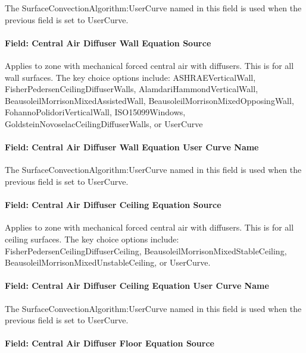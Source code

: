 The SurfaceConvectionAlgorithm:UserCurve named in this field is used when the previous field is set to UserCurve.

\paragraph{Field: Central Air Diffuser Wall Equation Source}\label{field-central-air-diffuser-wall-equation-source}

Applies to zone with mechanical forced central air with diffusers. This is for all wall surfaces. The key choice options include: ASHRAEVerticalWall, FisherPedersenCeilingDiffuserWalls, AlamdariHammondVerticalWall, BeausoleilMorrisonMixedAssistedWall, BeausoleilMorrisonMixedOpposingWall, FohannoPolidoriVerticalWall, ISO15099Windows, GoldsteinNovoselacCeilingDiffuserWalls, or UserCurve

\paragraph{Field: Central Air Diffuser Wall Equation User Curve Name}\label{field-central-air-diffuser-wall-equation-user-curve-name}

The SurfaceConvectionAlgorithm:UserCurve named in this field is used when the previous field is set to UserCurve.

\paragraph{Field: Central Air Diffuser Ceiling Equation Source}\label{field-central-air-diffuser-ceiling-equation-source}

Applies to zone with mechanical forced central air with diffusers. This is for all ceiling surfaces. The key choice options include: FisherPedersenCeilingDiffuserCeiling, BeausoleilMorrisonMixedStableCeiling, BeausoleilMorrisonMixedUnstableCeiling, or UserCurve.

\paragraph{Field: Central Air Diffuser Ceiling Equation User Curve Name}\label{field-central-air-diffuser-ceiling-equation-user-curve-name}

The SurfaceConvectionAlgorithm:UserCurve named in this field is used when the previous field is set to UserCurve.

\paragraph{Field: Central Air Diffuser Floor Equation Source}\label{field-central-air-diffuser-floor-equation-source}

